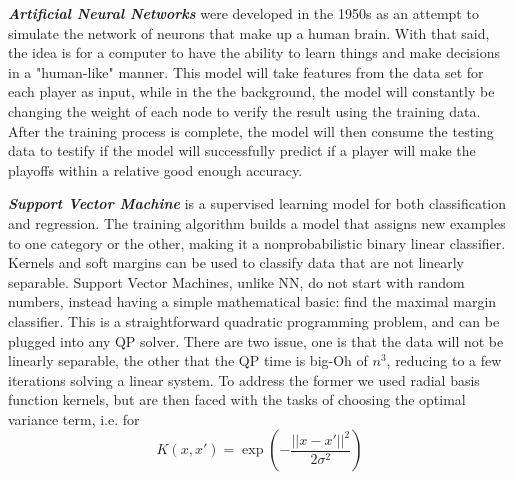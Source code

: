 \documentclass{article}
\begin{document}
\textbf{\textit{Artificial Neural Networks}} were developed in the 1950s as an attempt to simulate the network of neurons that make up a human brain. 
With that said, the idea is for a computer to have the ability to learn things and make decisions in a "human-like" manner. 
This model will take features from the data set for each player as input, while in the the background, the model will constantly be changing the weight of each node to verify the result using the training data. 
After the training process is complete, the model will then consume the testing data to testify if the model will successfully predict if a player will make the playoffs within a relative good enough accuracy.


\textbf{\textit{Support Vector Machine}} is a supervised learning model for both classification and regression. 
The training algorithm builds a model that assigns new
examples to one category or the other, making it a nonprobabilistic binary linear classifier.
Kernels and soft margins can be used to classify data that are not linearly separable.
Support Vector Machines, unlike NN, do not start with random numbers, instead having a simple mathematical basic: find the maximal margin classifier. This is a straightforward quadratic programming problem, and can be plugged into any QP solver. 
There are two issue, one is that the data will not be linearly separable, the other that the QP time is big-Oh of $n^3$, reducing to a few iterations solving a linear system. To address the former we used radial basis function kernels, but are then faced with the tasks of choosing the optimal variance term, i.e. for 
$$
K(x,x') = \exp \left( - \frac{||x-x'||^2}{2\sigma^2} \right)
$$
\end{document}
